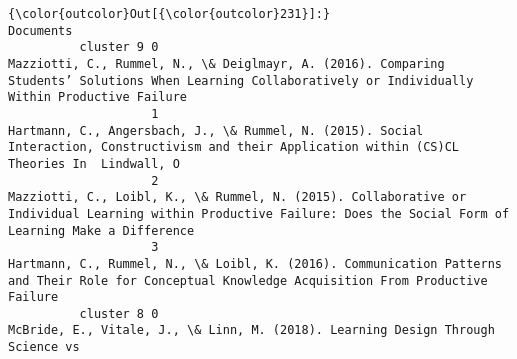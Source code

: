 \documentclass[journal,twocolumn]{IEEEtran}
\begin{document}
\begin{Verbatim}[commandchars=\\\{\}]
{\color{outcolor}Out[{\color{outcolor}231}]:}                                                                                                                                                                                                                                                                                                                                                                                                                                 Documents
          cluster 9 0                                                                                                                                                                                                                                                                     Mazziotti, C., Rummel, N., \& Deiglmayr, A. (2016). Comparing Students’ Solutions When Learning Collaboratively or Individually Within Productive Failure 
                    1                                                                                                                                                                                                                                                                            Hartmann, C., Angersbach, J., \& Rummel, N. (2015). Social Interaction, Constructivism and their Application within (CS)CL Theories In  Lindwall, O
                    2                                                                                                                                                                                                                                                             Mazziotti, C., Loibl, K., \& Rummel, N. (2015). Collaborative or Individual Learning within Productive Failure: Does the Social Form of Learning Make a Difference
                    3                                                                                                                                                                                                                                                                             Hartmann, C., Rummel, N., \& Loibl, K. (2016). Communication Patterns and Their Role for Conceptual Knowledge Acquisition From Productive Failure 
          cluster 8 0                                                                                                                                                                                                                                                                                                                                                McBride, E., Vitale, J., \& Linn, M. (2018). Learning Design Through Science vs

\end{Verbatim}
\end{document}
